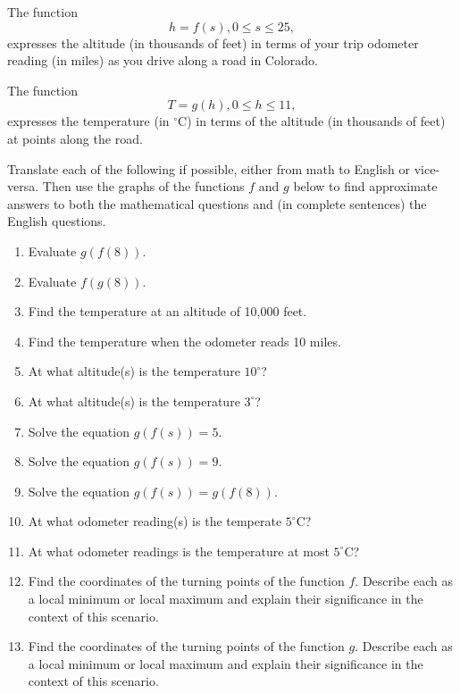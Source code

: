 \documentclass{ximera}
\begin{document}
\begin{example}  \label{Ex3:Comp}
The function
\[
     h = f(s) , 0\leq s \leq 25 ,
\]
expresses the altitude (in thousands of feet) in terms of your trip odometer reading (in miles) as you drive along a road in Colorado. 

The function 
\[
  T = g(h) , 0\leq h \leq 11 ,
\]
expresses the temperature (in $^\circ$C) in terms of the altitude (in thousands of feet) at points along the road.

Translate each of the following if possible, either from math to English or vice-versa. Then use the graphs of the functions $f$ and $g$ below to find approximate answers to both the mathematical questions and (in complete sentences) the English questions.

\begin{enumerate}
\item Evaluate $g(f(8))$.

\item  Evaluate $f(g(8))$.

\item  Find the temperature at an altitude of 10,000 feet.

\item Find the temperature when the odometer reads 10 miles.

\item At what altitude(s) is the temperature $10^\circ$?

\item At what altitude(s) is the temperature $3^\circ$?

\item Solve the equation $g(f(s)) = 5$.

\item Solve the equation $g(f(s)) = 9$.

\item Solve the equation $g(f(s)) = g(f(8))$.

\item At what odometer reading(s) is the temperate $5^\circ$C?

\item At what odometer readings is the temperature at most $5^\circ$C?

\item Find the coordinates of the turning points of the function $f$. Describe each as a local minimum or local maximum and explain their significance in the context of this scenario.

\item Find the coordinates of the turning points of the function $g$. Describe each as a local minimum or local maximum and explain their significance in the context of this scenario.


\end{enumerate}
\end{example}
\end{document}
